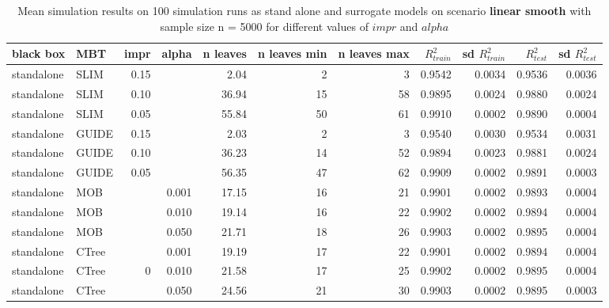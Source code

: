 \begin{table}

\caption{Mean simulation results on 100 simulation runs as stand alone and surrogate models on scenario \textbf{linear smooth} with sample size n = 5000 for different values of $impr$ and $alpha$}
\centering \tiny
\begin{tabular}[t]{l|l|r|r|r|r|r|r|r|r|r}
\hline
black box & MBT & impr & alpha & n leaves & n leaves min & n leaves max &  $R^2_{train}$ & sd $R^2_{train}$ & $R^2_{test}$ & sd $R^2_{test}$\\

\hline

standalone & SLIM & 0.15 & & 2.04 & 2 & 3 & 0.9542 & 0.0034 & 0.9536 & 0.0036\\
standalone & SLIM & 0.10 & & 36.94 & 15 & 58 & 0.9895 & 0.0024 & 0.9880 & 0.0024\\
standalone & SLIM & 0.05 & & 55.84 & 50 & 61 & 0.9910 & 0.0002 & 0.9890 & 0.0004\\
standalone & GUIDE & 0.15 & & 2.03 & 2 & 3 & 0.9540 & 0.0030 & 0.9534 & 0.0031\\
standalone & GUIDE & 0.10 & & 36.23 & 14 & 52 & 0.9894 & 0.0023 & 0.9881 & 0.0024\\
standalone & GUIDE & 0.05 & & 56.35 & 47 & 62 & 0.9909 & 0.0002 & 0.9891 & 0.0003\\
standalone & MOB & & 0.001 & 17.15 & 16 & 21 & 0.9901 & 0.0002 & 0.9893 & 0.0004\\
standalone & MOB & & 0.010 & 19.14 & 16 & 22 & 0.9902 & 0.0002 & 0.9894 & 0.0004\\
standalone & MOB & & 0.050 & 21.71 & 18 & 26 & 0.9903 & 0.0002 & 0.9895 & 0.0004\\
standalone & CTree & & 0.001 & 19.19 & 17 & 22 & 0.9901 & 0.0002 & 0.9894 & 0.0004\\
standalone & CTree &0 & 0.010 & 21.58 & 17 & 25 & 0.9902 & 0.0002 & 0.9895 & 0.0004\\
standalone & CTree & & 0.050 & 24.56 & 21 & 30 & 0.9903 & 0.0002 & 0.9895 & 0.0003\\



\end{tabular}
\end{table}
